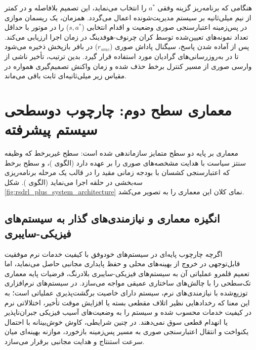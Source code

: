 \documentclass[oneside,openany,phd]{TMU-Thesis}
\begin{document}
هنگامی که برنامه‌ریز گزینه وفقی $a^*$ را انتخاب می‌نماید، این تصمیم بلافاصله و در کمتر از نیم میلی‌ثانیه بر سیستم مدیریت‌شونده اعمال می‌گردد. همزمان، یک ریسمان موازی در پس‌زمینه اعتبارسنجی صوری وضعیت و اقدام انتخابی ($s, a^*$) را در موتور  با حداقل تعداد نمونه‌های تعیین‌شده توسط کران چرنوف-هوفدینگ در زمان اجرا ارزیابی می‌کند. پس از آماده شدن پاسخ، سیگنال پاداش صوری ($r_{smc}$) در بافر بازپخش ذخیره می‌شود تا در به‌روزرسانی‌های گرادیان مورد استفاده قرار گیرد. بدین ترتیب، تأخیر ناشی از وارسی صوری از مسیر کنترل برخط حذف شده و زمان واکنش تصمیم‌گیری همواره در مقیاس زیر میلی‌ثانیه‌ای ثابت باقی می‌ماند.

\section{معماری سطح دوم: چارچوب دوسطحی سیستم پیشرفته \texorpdfstring{\rsdrlplus}{RS-DRL+}}
\label{sec:rsdrl_plus_architecture}
\label{sec:rsdrlplus_macro_architecture}

معماری \rsdrlplus بر پایه دو سطح متمایز سازماندهی شده است: سطح غیربرخط که وظیفه سنتز سیاست با هدایت مشخصه‌های صوری را بر عهده دارد (الگوی \sgos)، و سطح برخط که اعتبارسنجی کشسان با بودجه زمانی مقید را در قالب یک مرحله برنامه‌ریزی سه‌بخشی در حلقه  اجرا می‌نماید (الگوی \caepv). شکل \ref{fig:rsdrl_plus_system_architecture} نمای کلان این معماری را به تصویر می‌کشد.

\subsection{انگیزه معماری و نیازمندی‌های گذار به سیستم‌های فیزیکی-سایبری}
\label{sec:cps_reality_gap_trilemma}
\label{subsec:cps_transition_architectural_rationale}

اگرچه چارچوب پایه‌ای  در سیستم‌های خودوفق با کیفیت خدمات نرم موفقیت قابل‌توجهی در خروج از بهینه‌های محلی و حفظ پایداری مجانبی حاصل می‌نماید، اما تعمیم قلمرو عملیاتی آن به سیستم‌های فیزیکی-سایبری بلادرنگ، فرضیات پایه معماری تک‌سطحی را با چالش‌های ساختاری عمیقی مواجه می‌سازد. در سیستم‌های نرم‌افزاری توزیع‌شده با نیازمندی‌های نرم، سیستم دارای خاصیت برگشت‌پذیری عملیاتی است؛ به این معنا که رخدادهایی نظیر اتلاف مقطعی بسته یا افزایش موقت تأخیر، اختلالاتی نرم در کیفیت خدمات محسوب شده و سیستم را به وضعیت‌های آسیب فیزیکی جبران‌ناپذیر یا انهدام قطعی سوق نمی‌دهند. در چنین شرایطی، کاوش خوش‌بینانه با احتمال یکنواخت و انتقال اعتبارسنجی صوری به مسیر پس‌زمینه بازخورد، موازنه بهینه‌ای میان سرعت استنتاج و هدایت مجانبی برقرار می‌سازد.
\end{document}
